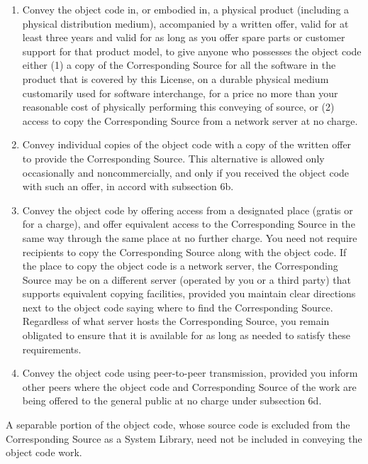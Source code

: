 \documentclass[11pt]{article}
\begin{document}
\begin{enumerate}
\begin{enumerate}
  \item Convey the object code in, or embodied in, a physical product
  (including a physical distribution medium), accompanied by a
  written offer, valid for at least three years and valid for as
  long as you offer spare parts or customer support for that product
  model, to give anyone who possesses the object code either (1) a
  copy of the Corresponding Source for all the software in the
  product that is covered by this License, on a durable physical
  medium customarily used for software interchange, for a price no
  more than your reasonable cost of physically performing this
  conveying of source, or (2) access to copy the
  Corresponding Source from a network server at no charge.

  \item Convey individual copies of the object code with a copy of the
  written offer to provide the Corresponding Source.  This
  alternative is allowed only occasionally and noncommercially, and
  only if you received the object code with such an offer, in accord
  with subsection 6b.

  \item Convey the object code by offering access from a designated
  place (gratis or for a charge), and offer equivalent access to the
  Corresponding Source in the same way through the same place at no
  further charge.  You need not require recipients to copy the
  Corresponding Source along with the object code.  If the place to
  copy the object code is a network server, the Corresponding Source
  may be on a different server (operated by you or a third party)
  that supports equivalent copying facilities, provided you maintain
  clear directions next to the object code saying where to find the
  Corresponding Source.  Regardless of what server hosts the
  Corresponding Source, you remain obligated to ensure that it is
  available for as long as needed to satisfy these requirements.

  \item Convey the object code using peer-to-peer transmission, provided
  you inform other peers where the object code and Corresponding
  Source of the work are being offered to the general public at no
  charge under subsection 6d.
  \end{enumerate}

A separable portion of the object code, whose source code is excluded
from the Corresponding Source as a System Library, need not be
included in conveying the object code work.


\end{enumerate}
\end{document}
